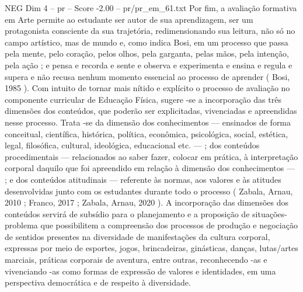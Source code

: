 \begin{textsample}{NEG Dim 4 – pr – Score -2.00 – pr/pr\_em\_61.txt}  \label{ex:f4_neg_110}
Por fim, a avaliação formativa em Arte permite ao estudante ser autor de sua aprendizagem, ser um protagonista consciente da sua trajetória, redimensionando sua leitura, não só no campo artístico, mas de mundo e, como indica Bosi, em um processo que passa pela mente, pelo coração, pelos olhos, pela garganta, pelas mãos, pela intenção, pela ação ; e pensa e recorda e sente e observa e experimenta e ensina e regula e supera e não recusa nenhum momento essencial ao processo de aprender ( Bosi, 1985 ).
Com intuito de tornar mais nítido e explícito o processo de avaliação no componente curricular de Educação Física, sugere -se a incorporação das três dimensões dos conteúdos, que poderão ser explicitadas, vivenciadas e apreendidas nesse processo.
Trata -se da dimensão dos conhecimentos — ensinados de forma conceitual, científica, histórica, política, econômica, psicológica, social, estética, legal, filosófica, cultural, ideológica, educacional etc. — ; dos conteúdos procedimentais — relacionados ao saber fazer, colocar em prática, à interpretação corporal daquilo que foi apreendido em relação à dimensão dos conhecimentos — ; e dos conteúdos atitudinais — referente às normas, aos valores e às atitudes desenvolvidas junto com os estudantes durante todo o processo ( Zabala, Arnau, 2010 ; Franco, 2017 ; Zabala, Arnau, 2020 ).
A incorporação das dimensões dos conteúdos servirá de subsídio para o planejamento e a proposição de situações-problema que possibilitem a compreensão dos processos de produção e negociação de sentidos presentes na diversidade de manifestações da cultura corporal, expressas por meio de esportes, jogos, brincadeiras, ginásticas, danças, lutas/artes marciais, práticas corporais de aventura, entre outras, reconhecendo -as e vivenciando -as como formas de expressão de valores e identidades, em uma perspectiva democrática e de respeito à diversidade.

\end{textsample}
